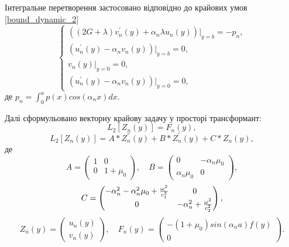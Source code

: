 Інтегральне перетворення застосовано відповідно до крайових умов \eqref{bound_dynamic_2}
\begin{equation}\label{transf_bound_dynamic_2}
    \begin{cases}
        \left( (2G + \lambda)v_n^{'}(y) + \alpha_n \lambda u_n(y) \right)|_{y=b} = -p_n, \\
        \left(u_n^{'}(y) - \alpha_n v_n(y)  \right)|_{y=b} = 0, \\
        v_n(y)|_{y=0} = 0, \\
        \left(u_n^{'}(y) - \alpha_n v_n(y)  \right)|_{y=0} = 0,
    \end{cases}
\end{equation}
де $p_n = \int_{0}^{a} p(x) cos(\alpha_n x) dx$.

Далі сформульовано векторну крайову задачу у просторі трансформант:
\begin{equation}\label{transf_mat_dynamic_2}
    L_2\left[ Z_n(y) \right] = F_n(y),
\end{equation}
\begin{equation}
    L_2\left[ Z_n(y) \right] = A * Z_n^{''}(y) + B * Z_n^{'}(y) + C * Z_n(y),
\end{equation}
де
\begin{equation*}
    A = \begin{pmatrix}
        1 & 0 \\
        0 & 1 + \mu_0
    \end{pmatrix}, \quad
    B = \begin{pmatrix}
        0 & -\alpha_n \mu_0 \\
        \alpha_n \mu_0 & 0
    \end{pmatrix},
\end{equation*}
\begin{equation*}
    \centering
    C = \begin{pmatrix}
        -\alpha_n^2 -\alpha_n^2 \mu_0 + \frac{\omega^2}{c_1^2} & 0 \\
        0 & -\alpha_n^2 + \frac{\omega^2}{c_2^2}
    \end{pmatrix},
\end{equation*}
\begin{equation*}
    Z_n(y) = \begin{pmatrix}
        u_n(y) \\
        v_n(y)
    \end{pmatrix}, \quad 
    F_n(y) = \begin{pmatrix}
        -(1 + \mu_0)sin(\alpha_n a) f(y) \\
        0
    \end{pmatrix}.
\end{equation*}
